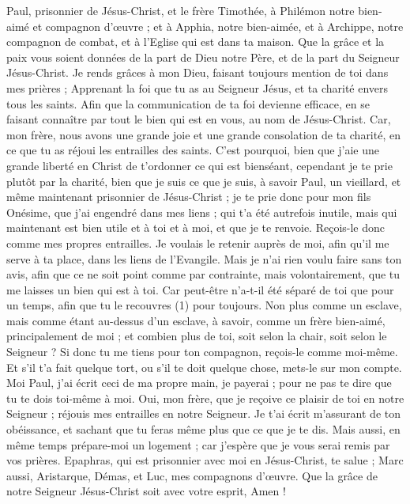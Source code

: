 \BFont
\begin{multicols}{2}
\VerseOne{}Paul, prisonnier de Jésus-Christ, et le frère Timothée, à Philémon notre bien-aimé et compagnon d'œuvre ;
et à Apphia, notre bien-aimée, et à Archippe, notre compagnon de combat, et à l'Eglise qui est dans ta maison.
Que la grâce et la paix vous soient données de la part de Dieu notre Père, et de la part du Seigneur Jésus-Christ.
Je rends grâces à mon Dieu, faisant toujours mention de toi dans mes prières ;
Apprenant la foi que tu as au Seigneur Jésus, et ta charité envers tous les saints.
Afin que la communication de ta foi devienne efficace, en se faisant connaître par tout le bien qui est en vous, au nom de Jésus-Christ.
Car, mon frère, nous avons une grande joie et une grande consolation de ta charité, en ce que tu as réjoui les entrailles des saints.
C'est pourquoi, bien que j'aie une grande liberté en Christ de t’ordonner ce qui est bienséant,
cependant je te prie plutôt par la charité, bien que je suis ce que je suis, à savoir Paul, un vieillard, et même maintenant prisonnier de Jésus-Christ ;
je te prie donc pour mon fils Onésime, que j'ai engendré dans mes liens ;
qui t'a été autrefois inutile, mais qui maintenant est bien utile et à toi et à moi, et que je te renvoie.
Reçois-le donc comme mes propres entrailles.
Je voulais le retenir auprès de moi, afin qu'il me serve à ta place, dans les liens de l'Evangile.
Mais je n'ai rien voulu faire sans ton avis, afin que ce ne soit point comme par contrainte, mais volontairement, que tu me laisses un bien qui est à toi.
Car peut-être n'a-t-il été séparé de toi que pour un temps, afin que tu le recouvres (1) pour toujours.
Non plus comme un esclave, mais comme étant au-dessus d'un esclave, à savoir, comme un frère bien-aimé, principalement de moi ; et combien plus de toi, soit selon la chair, soit selon le Seigneur ?
Si donc tu me tiens pour ton compagnon, reçois-le comme moi-même.
Et s'il t'a fait quelque tort, ou s'il te doit quelque chose, mets-le sur mon compte.
Moi Paul, j'ai écrit ceci de ma propre main, je payerai ; pour ne pas te dire que tu te dois toi-même à moi.
Oui, mon frère, que je reçoive ce plaisir de toi en notre Seigneur ; réjouis mes entrailles en notre Seigneur.
Je t'ai écrit m'assurant de ton obéissance, et sachant que tu feras même plus que ce que je te dis.
Mais aussi, en même temps prépare-moi un logement ; car j'espère que je vous serai remis par vos prières.
Epaphras, qui est prisonnier avec moi en Jésus-Christ, te salue ;
Marc aussi, Aristarque, Démas, et Luc, mes compagnons d'œuvre.
Que la grâce de notre Seigneur Jésus-Christ soit avec votre esprit, Amen !
\PPE{}
\end{multicols}
